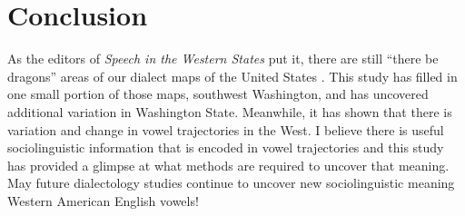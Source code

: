 \section{Conclusion}

As the editors of \textit{Speech in the Western States} put it, there are still ``there be dragons'' areas of our dialect maps of the United States \citep[172]{fridland_etal_2017_pads}. This study has filled in one small portion of those maps, southwest Washington, and has uncovered additional variation in Washington State. Meanwhile, it has shown that there is variation and change in vowel trajectories in the West. I believe there is useful sociolinguistic information that is encoded in vowel trajectories and this study has provided a glimpse at what methods are required to uncover that meaning. May future dialectology studies continue to uncover new sociolinguistic meaning Western American English vowels! 
